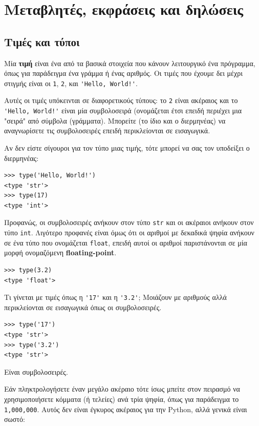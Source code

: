 \documentclass[10pt]{book}
\begin{document}
\chapter{Μεταβλητές, εκφράσεις και δηλώσεις}

\section{Τιμές και τύποι}

Μία {\bf τιμή} είναι ένα από τα βασικά στοιχεία που κάνουν λειτουργικό 
ένα πρόγραμμα, όπως για παράδειγμα ένα γράμμα ή ένας αριθμός.  Οι τιμές που έχουμε δει μέχρι στιγμής είναι οι {\tt 1}, {\tt 2}, και \verb"'Hello, World!'".

Αυτές οι τιμές υπόκεινται σε διαφορετικούς τύπους:
το {\tt 2} είναι ακέραιος και το \verb"'Hello, World!'" είναι
μία συμβολοσειρά (ονομάζεται έτσι επειδή περιέχει μια "σειρά" από
σύμβολα (γράμματα). Μπορείτε (το ίδιο και ο διερμηνέας) να αναγνωρίσετε τις συμβολοσειρές επειδή περικλείονται σε εισαγωγικά.

Αν δεν είστε σίγουροι για τον τύπο μιας τιμής, τότε μπορεί να σας τον υποδείξει ο διερμηνέας:

\begin{verbatim}
>>> type('Hello, World!')
<type 'str'>
>>> type(17)
<type 'int'>
\end{verbatim}
%

Προφανώς, οι συμβολοσειρές ανήκουν στον τύπο {\tt str}
και οι ακέραιοι ανήκουν στον τύπο {\tt int}.  
Λιγότερο προφανές είναι όμως ότι οι αριθμοί με δεκαδικά ψηφία ανήκουν
σε ένα τύπο που ονομάζεται {\tt float}, επειδή αυτοί οι αριθμοί
παριστάνονται σε μία μορφή ονομαζόμενη {\bf floating-point}.

\begin{verbatim}
>>> type(3.2)
<type 'float'>
\end{verbatim}
%
Τι γίνεται με τιμές όπως η \verb"'17'" και η 
\verb"'3.2'"; Μοιάζουν με αριθμούς αλλά περικλείονται
σε εισαγωγικά όπως οι συμβολοσειρές.

\begin{verbatim}
>>> type('17')
<type 'str'>
>>> type('3.2')
<type 'str'>
\end{verbatim}
%

Είναι συμβολοσειρές.

Εάν πληκτρολογήσετε έναν μεγάλο ακέραιο τότε ίσως μπείτε στον πειρασμό
να χρησιμοποιήσετε κόμματα (ή τελείες) ανά τρία ψηφία, όπως για παράδειγμα το
{\tt 1,000,000}. Αυτός δεν είναι έγκυρος ακέραιος για την 
Python, αλλά γενικά είναι σωστό:
\end{document}
